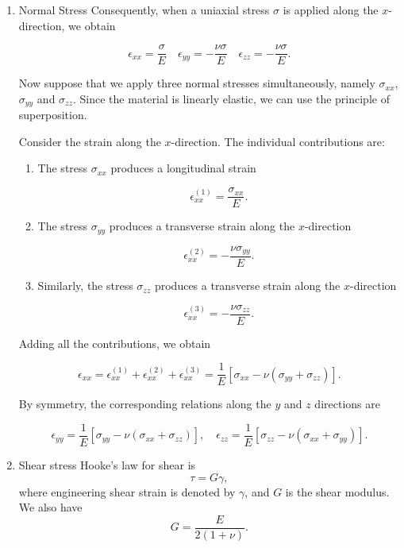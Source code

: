 \documentclass[10pt,a4paper]{article}
\begin{document}
\begin{enumerate}
    \item \textcolor{red!70!black}{Normal Stress} Consequently, when a uniaxial stress \(\sigma\) is applied along
the \(x\)-direction, we obtain

\[
\epsilon_{xx}=\frac{\sigma}{E}
\quad
\epsilon_{yy}=-\frac{\nu\sigma}{E}
\quad
\epsilon_{zz}=-\frac{\nu\sigma}{E}.
\]

Now suppose that we apply three normal stresses simultaneously,
namely \(\sigma_{xx}\), \(\sigma_{yy}\) and \(\sigma_{zz}\).
Since the material is linearly elastic, we can use the
principle of superposition.

Consider the strain along the \(x\)-direction.
    The individual contributions are:

    \begin{enumerate}

        \item The stress \(\sigma_{xx}\) produces a longitudinal
        strain

        \[
        \epsilon_{xx}^{(1)}=\frac{\sigma_{xx}}{E}.
        \]

        \item The stress \(\sigma_{yy}\) produces a transverse
        strain along the \(x\)-direction

        \[
        \epsilon_{xx}^{(2)}=-\frac{\nu\sigma_{yy}}{E}.
        \]

        \item Similarly, the stress \(\sigma_{zz}\) produces
        a transverse strain along the \(x\)-direction

        \[
        \epsilon_{xx}^{(3)}=-\frac{\nu\sigma_{zz}}{E}.
        \]

    \end{enumerate}

Adding all the contributions, we obtain

\[
\epsilon_{xx}
=
\epsilon_{xx}^{(1)}
+\epsilon_{xx}^{(2)}
+\epsilon_{xx}^{(3)}
=
\frac{1}{E}
\left[
\sigma_{xx}-\nu(\sigma_{yy}+\sigma_{zz})
\right].
\]

By symmetry, the corresponding relations along the \(y\) and
\(z\) directions are

\[
\epsilon_{yy}
=
\frac{1}{E}
\left[
\sigma_{yy}-\nu(\sigma_{xx}+\sigma_{zz})
\right],
\quad 
\epsilon_{zz}
=
\frac{1}{E}
\left[
\sigma_{zz}-\nu(\sigma_{xx}+\sigma_{yy})
\right].
\]
\item \textsf{\textcolor{red!70!black}{Shear stress}} Hooke's law for shear is
\[
\tau = G\gamma,
\]
where \textsf{\textcolor{blue!70!black}{engineering shear strain}} is denoted by \(\gamma\), and \(G\) is the \textsf{\textcolor{blue!70!black}{shear modulus}}. We also have
\[
G = \frac{E}{2(1+\nu)}.
\]
\end{enumerate}
\end{document}

